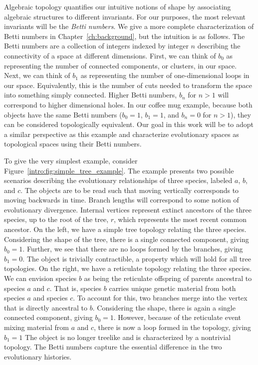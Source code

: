 Algebraic topology quantifies our intuitive notions of shape by associating algebraic structures to different invariants.
For our purposes, the most relevant invariants will be the \emph{Betti numbers}.
We give a more complete characterization of Betti numbers in Chapter~\ref{ch:background}, but the intuition is as follows.
The Betti numbers are a collection of integers indexed by integer $n$ describing the connectivity of a space at different dimensions.
First, we can think of $b_0$ as representing the number of connected components, or clusters, in our space.
Next, we can think of $b_1$ as representing the number of one-dimensional loops in our space.
Equivalently, this is the number of cuts needed to transform the space into something simply connected.
Higher Betti numbers, $b_n$ for $n>1$ will correspond to higher dimensional holes.
In our coffee mug example, because both objects have the same Betti numbers ($b_0=1$, $b_1=1$, and $b_n=0$ for $n>1$), they can be considered topologically equivalent.
Our goal in this work will be to adopt a similar perspective as this example and characterize evolutionary spaces as topological spaces using their Betti numbers.

To give the very simplest example, consider Figure~\ref{intro:fig:simple_tree_example}.
The example presents two possible scenarios describing the evolutionary relationships of three species, labeled $a$, $b$, and $c$.
The objects are to be read such that moving vertically corresponds to moving backwards in time.
Branch lengths will correspond to some notion of evolutionary divergence.
Internal vertices represent extinct ancestors of the three species, up to the root of the tree, $r$, which represents the most recent common ancestor.
On the left, we have a simple tree topology relating the three species.
Considering the shape of the tree, there is a single connected component, giving $b_0=1$.
Further, we see that there are no loops formed by the branches, giving $b_1=0$.
The object is trivially contractible, a property which will hold for all tree topologies.
On the right, we have a reticulate topology relating the three species.
We can envision species $b$ as being the reticulate offspring of parents ancestral to species $a$ and $c$.
That is, species $b$ carries unique genetic material from both species $a$ and species $c$.
To account for this, two branches merge into the vertex that is directly ancestral to $b$.
Considering the shape, there is again a single connected component, giving $b_0=1$.
However, because of the reticulate event mixing material from $a$ and $c$, there is now a loop formed in the topology, giving $b_1=1$
The object is no longer treelike and is characterized by a nontrivial topology.
The Betti numbers capture the essential difference in the two evolutionary histories.

